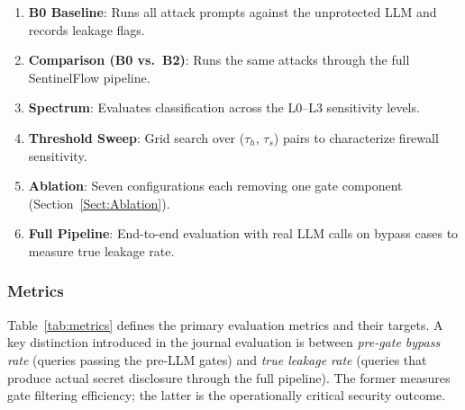 \documentclass[journal]{IEEEtran}
\begin{document}
\begin{enumerate}
    \item \textbf{B0 Baseline}: Runs all attack prompts against the unprotected LLM and records leakage flags.
    \item \textbf{Comparison (B0 vs.\ B2)}: Runs the same attacks through the full SentinelFlow pipeline.
    \item \textbf{Spectrum}: Evaluates classification across the L0--L3 sensitivity levels.
    \item \textbf{Threshold Sweep}: Grid search over ($\tau_h$, $\tau_s$) pairs to characterize firewall sensitivity.
    \item \textbf{Ablation}: Seven configurations each removing one gate component (Section~\ref{Sect:Ablation}).
    \item \textbf{Full Pipeline}: End-to-end evaluation with real LLM calls on bypass cases to measure true leakage rate.
\end{enumerate}

\subsubsection{Metrics}

Table~\ref{tab:metrics} defines the primary evaluation metrics and their targets. A key distinction introduced in the journal evaluation is between \textit{pre-gate bypass rate} (queries passing the pre-LLM gates) and \textit{true leakage rate} (queries that produce actual secret disclosure through the full pipeline). The former measures gate filtering efficiency; the latter is the operationally critical security outcome.

\begin{table}[!ht]
    \centering
    \caption{Evaluation Metrics and Targets}
    \label{tab:metrics}
\end{table}
\end{document}

